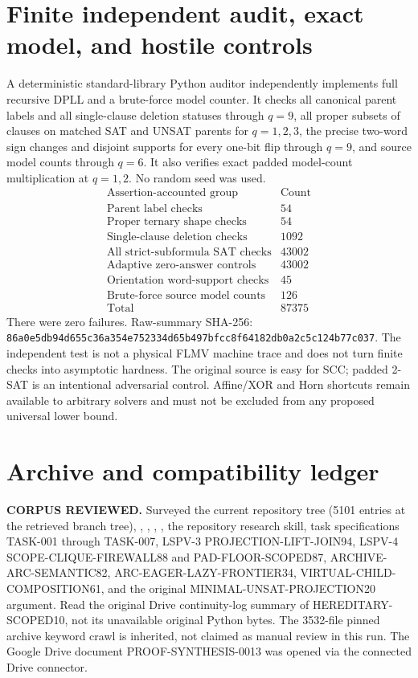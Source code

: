 \documentclass[11pt]{article}
\begin{document}
\section{Finite independent audit, exact model, and hostile controls}
A deterministic standard-library Python auditor independently implements full recursive DPLL and a brute-force model counter. It checks all canonical parent labels and all single-clause deletion statuses through \(q=9\), all proper subsets of clauses on matched SAT and UNSAT parents for \(q=1,2,3\), the precise two-word sign changes and disjoint supports for every one-bit flip through \(q=9\), and source model counts through \(q=6\). It also verifies exact padded model-count multiplication at \(q=1,2\). No random seed was used.
\[
\begin{array}{l|r}
\text{Assertion-accounted group}&\text{Count}\\\hline
\text{Parent label checks}&54\\
\text{Proper ternary shape checks}&54\\
\text{Single-clause deletion checks}&1092\\
\text{All strict-subformula SAT checks}&43002\\
\text{Adaptive zero-answer controls}&43002\\
\text{Orientation word-support checks}&45\\
\text{Brute-force source model counts}&126\\\hline
\text{Total}&87375
\end{array}
\]
There were zero failures. Raw-summary SHA-256:
\texttt{86a0e5db94d655c36a354e752334d65b497bfcc8f64182db0a2c5c124b77c037}.
The independent test is not a physical FLMV machine trace and does not turn finite checks into asymptotic hardness. The original source is easy for SCC; padded 2-SAT is an intentional adversarial control. Affine/XOR and Horn shortcuts remain available to arbitrary solvers and must not be excluded from any proposed universal lower bound.

\section{Archive and compatibility ledger}
\noindent\textbf{CORPUS REVIEWED.} Surveyed the current repository tree (5101 entries at the retrieved branch tree), , , , , the repository research skill, task specifications TASK-001 through TASK-007, LSPV-3 PROJECTION-LIFT-JOIN94, LSPV-4 SCOPE-CLIQUE-FIREWALL88 and PAD-FLOOR-SCOPED87, ARCHIVE-ARC-SEMANTIC82, ARC-EAGER-LAZY-FRONTIER34, VIRTUAL-CHILD-COMPOSITION61, and the original MINIMAL-UNSAT-PROJECTION20 argument. Read the original Drive continuity-log summary of HEREDITARY-SCOPED10, not its unavailable original Python bytes. The 3532-file pinned archive keyword crawl is inherited, not claimed as manual review in this run. The Google Drive document PROOF-SYNTHESIS-0013 was opened via the connected Drive connector.
\end{document}

